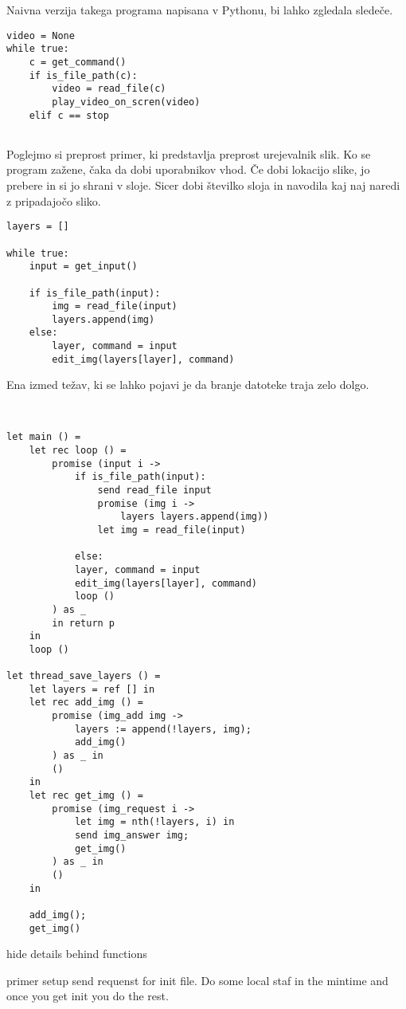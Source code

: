Naivna verzija takega programa napisana v Pythonu, bi lahko zgledala sledeče.

\begin{lstlisting}[caption={Naiven program.},label={prog:predvajalnik-naiven}]
video = None
while true:
	c = get_command()
	if is_file_path(c):
		video = read_file(c)
		play_video_on_scren(video)
	elif c == stop
		
\end{lstlisting}


Poglejmo si preprost primer, ki predstavlja preprost urejevalnik slik.
Ko se program zažene, čaka da dobi uporabnikov vhod.
Če dobi lokacijo slike, jo prebere in si jo shrani v sloje.
Sicer dobi številko sloja in navodila kaj naj naredi z pripadajočo sliko.

\begin{lstlisting}[caption={Sinhron program.},label={prog:editor-python}]
layers = []

while true:
	input = get_input()
	
	if is_file_path(input):
		img = read_file(input)
		layers.append(img)
	else:
		layer, command = input	
		edit_img(layers[layer], command)
\end{lstlisting}

Ena izmed težav, ki se lahko pojavi je da branje datoteke traja zelo dolgo.



\begin{lstlisting}[caption={Asinhron program.},label={prog:editor-aeff}]


let main () = 
	let rec loop () = 
		promise (input i ->
			if is_file_path(input):
				send read_file input
				promise (img i ->
					layers layers.append(img))
				let img = read_file(input)
				
			else:
			layer, command = input	
			edit_img(layers[layer], command)
			loop ()
		) as _ 
		in return p
	in
	loop ()
	
let thread_save_layers () = 
	let layers = ref [] in
	let rec add_img () =
		promise (img_add img ->
			layers := append(!layers, img);
			add_img()
		) as _ in
		()
	in	
	let rec get_img () =
		promise (img_request i ->
			let img = nth(!layers, i) in
			send img_answer img;
			get_img()
		) as _ in
		()
	in
	
	add_img();
	get_img()

\end{lstlisting}


hide details behind functions

primer setup send requenst for init file. Do some local staf in the mintime and once you get init you do the rest.
